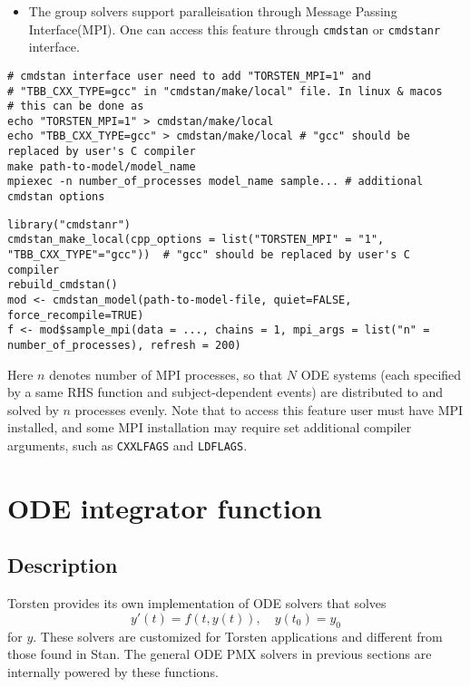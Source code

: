 \documentclass[12pt, reqno, oneside]{amsbook}
\numberwithin{equation}{chapter}
\numberwithin{figure}{chapter}
\numberwithin{table}{chapter}
\theoremstyle{remark}
\begin{document}
\begin{itemize}
\item The group solvers support paralleisation through Message Passing
Interface(MPI). One can access this feature through \texttt{cmdstan} or
\texttt{cmdstanr} interface.
\end{itemize}
\begin{verbatim}
# cmdstan interface user need to add "TORSTEN_MPI=1" and
# "TBB_CXX_TYPE=gcc" in "cmdstan/make/local" file. In linux & macos
# this can be done as
echo "TORSTEN_MPI=1" > cmdstan/make/local
echo "TBB_CXX_TYPE=gcc" > cmdstan/make/local # "gcc" should be replaced by user's C compiler
make path-to-model/model_name
mpiexec -n number_of_processes model_name sample... # additional cmdstan options
\end{verbatim}
\begin{verbatim}
library("cmdstanr")
cmdstan_make_local(cpp_options = list("TORSTEN_MPI" = "1", "TBB_CXX_TYPE"="gcc"))  # "gcc" should be replaced by user's C compiler
rebuild_cmdstan()
mod <- cmdstan_model(path-to-model-file, quiet=FALSE, force_recompile=TRUE)
f <- mod$sample_mpi(data = ..., chains = 1, mpi_args = list("n" = number_of_processes), refresh = 200)
\end{verbatim}
Here \(n\) denotes number of MPI processes, so that \(N\)
ODE systems (each specified by a same RHS function and
subject-dependent events) are distributed to and solved by \(n\)
processes evenly. Note that to access this feature user must have
MPI installed, and some MPI installation may require set additional
compiler arguments, such as \texttt{CXXLFAGS} and \texttt{LDFLAGS}.

\section{ODE integrator function}
\label{sec:org2654f2a}
\subsection{Description}
\label{sec:orge3aae27}
Torsten provides its own implementation of ODE solvers that solves
\begin{equation*}
  y'(t) = f(t, y(t)), \quad y(t_0) = y_0
\end{equation*}
for \(y\). These solvers
are customized for Torsten applications and different from those found
in Stan. The general ODE PMX solvers in previous sections are internally powered
by these functions.
\end{document}
